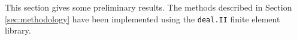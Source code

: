This section gives some preliminary results. The methods described
in Section \ref{sec:methodology} have been implemented using the
\texttt{deal.II} finite element library\cite{dealii}.





